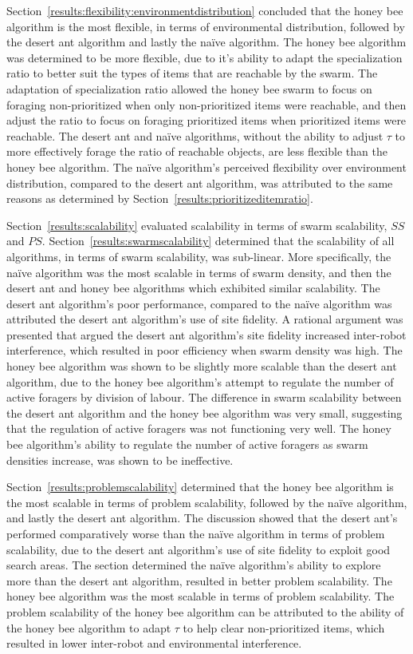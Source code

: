 Section~\ref{results:flexibility:environmentdistribution} concluded that the honey bee algorithm is the most flexible, in terms of environmental distribution, followed by the desert ant algorithm and lastly the na\"ive algorithm. The honey bee algorithm was determined to be more flexible, due to it's ability to adapt the specialization ratio to better suit the types of items that are reachable by the swarm. The adaptation of specialization ratio allowed the honey bee swarm to focus on foraging non-prioritized when only non-prioritized items were reachable, and then adjust the ratio to focus on foraging prioritized items when prioritized items were reachable. The desert ant and na\"ive algorithms, without the ability to adjust $\tau$ to more effectively forage the ratio of reachable objects, are less flexible than the honey bee algorithm.
  The na\"ive algorithm's perceived flexibility over environment distribution, compared to the desert ant algorithm, was attributed to the same reasons as determined by Section~\ref{results:prioritizeditemratio}. 
  
Section~\ref{results:scalability} evaluated scalability in terms of swarm scalability, $SS$ and $PS$. Section~\ref{results:swarmscalability} determined that the scalability of all algorithms, in terms of swarm scalability, was sub-linear. More specifically, the na\"ive algorithm was the most scalable in terms of swarm density, and then the desert ant and honey bee algorithms which exhibited similar scalability. The desert ant algorithm's poor performance, compared to the na\"ive algorithm was attributed the desert ant algorithm's use of site fidelity. A rational argument was presented that argued the desert ant algorithm's site fidelity increased inter-robot interference, which resulted in poor efficiency when swarm density was high. The honey bee algorithm was shown to be slightly more scalable than the desert ant algorithm, due to the honey bee algorithm's attempt to regulate the number of active foragers by division of labour. The difference in swarm scalability between the desert ant algorithm and the honey bee algorithm was very small, suggesting that the regulation of active foragers was not functioning very well. The honey bee algorithm's ability to regulate the number of active foragers as swarm densities increase, was shown to be ineffective. 

Section~\ref{results:problemscalability} determined that the honey bee algorithm is the most scalable in terms of problem scalability, followed by the na\"ive algorithm, and lastly the desert ant algorithm. The discussion showed that the desert ant's performed comparatively worse than the na\"ive algorithm in terms of problem scalability, due to the desert ant algorithm's use of site fidelity to exploit good search areas. The section determined the na\"ive algorithm's ability to explore more than the desert ant algorithm, resulted in better problem scalability. The honey bee algorithm was the most scalable in terms of problem scalability. The problem scalability of the honey bee algorithm can be attributed to the ability of the honey bee algorithm to adapt $\tau$ to help clear non-prioritized items, which resulted in lower inter-robot and environmental interference.

